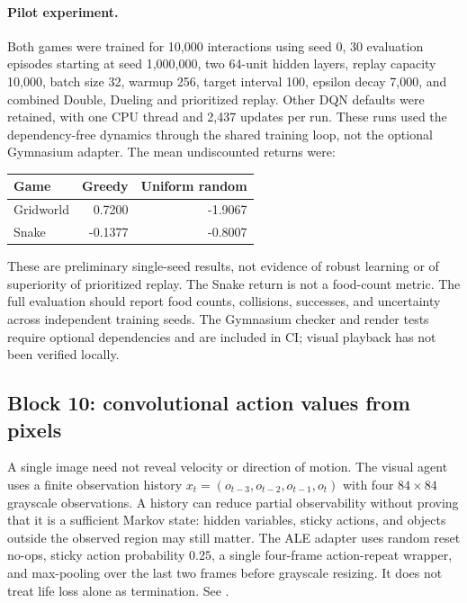 \documentclass[11pt,a4paper]{article}
\begin{document}
\paragraph{Pilot experiment.}
Both games were trained for 10,000 interactions using seed 0, 30 evaluation
episodes starting at seed 1,000,000, two 64-unit hidden layers, replay capacity
10,000, batch size 32, warmup 256, target interval 100, epsilon decay 7,000,
and combined Double, Dueling and prioritized replay. Other DQN defaults
were retained, with one CPU thread and 2,437 updates per run. These runs
used the dependency-free dynamics through the shared training loop, not
the optional Gymnasium adapter. The mean undiscounted returns were:
\begin{center}
\begin{tabular}{lrr}
\toprule Game & Greedy & Uniform random \\
\midrule
Gridworld & 0.7200 & -1.9067 \\
Snake & -0.1377 & -0.8007 \\
\bottomrule
\end{tabular}
\end{center}
These are preliminary single-seed results, not evidence of robust learning or
of superiority of prioritized replay. The Snake return is not a food-count
metric. The full evaluation should report food counts, collisions, successes,
and uncertainty across independent training seeds. The Gymnasium checker and
render tests require optional dependencies and are included in CI; visual
playback has not been verified locally.

\subsection{Block 10: convolutional action values from pixels}
A single image need not reveal velocity or direction of motion. The visual agent
uses a finite observation history $x_t=(o_{t-3},o_{t-2},o_{t-1},o_t)$ with four
$84\times84$ grayscale observations. A history can reduce partial observability
without proving that it is a sufficient Markov state: hidden variables, sticky
actions, and objects outside the observed region may still matter. The ALE adapter
uses random reset no-ops, sticky action probability $0.25$, a single four-frame
action-repeat wrapper, and max-pooling over the last two frames before grayscale
resizing. It does not treat life loss alone as termination. See \cite{ale,gymatari}.
\end{document}
